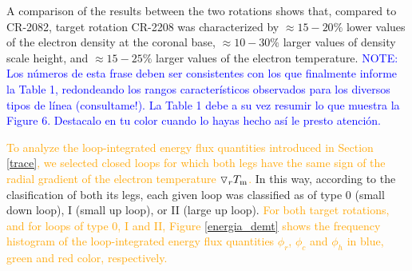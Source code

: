 \documentclass[namedreferences]{solarphysics}
\newcommand{\dr}{\triangledown_r}
\newcommand{\Tm}{T_{\rm m}}
\def\diego#1{\textcolor{red}{#1}}
\def\albert#1{\textcolor{orange}{#1}}
\def\notebyalbert#1{\textcolor{blue}{NOTE: #1}}
\begin{document}
\begin{article}
{A comparison of the results between the two rotations shows that, compared to CR-2082, target rotation CR-2208 was characterized by $\approx 15-20\%$ lower values of the electron density at the coronal base, $\approx 10-30\%$ larger values of density scale height, and $\approx 15-25\%$ larger values of the electron temperature.} \notebyalbert{Los números de esta frase deben ser consistentes con los que finalmente informe la Table 1, redondeando los rangos característicos observados para los diversos tipos de línea (consultame!). La Table 1 debe a su vez resumir lo que muestra la Figure 6. Destacalo en tu color cuando lo hayas hecho así le presto atención.}



\albert{To analyze the loop-integrated energy flux quantities introduced in Section \ref{trace}, we selected closed loops for which both legs have the same sign of the radial gradient of the electron temperature $\dr\Tm$.} In this way, according to the clasification of both its legs, each given loop was classified as of type 0 (small down loop), I (small up loop), or II (large up loop). \albert{For both target rotations, and for loops of type 0, I and II, Figure \ref{energia_demt} shows the frequency histogram of the loop-integrated energy flux quantities {$\phi_r$, $\phi_c$ and $\phi_h$ in blue, green and red color}, respectively.}


\end{article}
\end{document}
